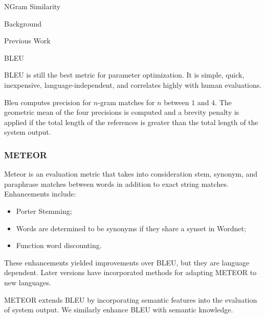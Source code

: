 \begin{block}{NGram Similarity}

Background

Previous Work


BLEU


BLEU is still the best metric for parameter optimization\cite{Cer:2010:BLM:1857999.1858079}. 
It is simple, quick, inexpensive, language-independent, and correlates highly with human evaluations. 


Bleu computes precision for $n$-gram matches for $n$ between $1$ and $4$. 
The geometric mean of the four precisions is computed and a brevity penalty is applied if the total length of the references is greater than the total length of the system output. 

\subsubsection{METEOR}
\label{sec:meteor}


Meteor is an evaluation metric that takes into consideration stem, synonym, and paraphrase matches between words in addition to exact string matches.
Enhancements include:
\begin{itemize}
\item 
Porter Stemming;
\item 
Words  are determined to  be synonyms if they share a synset in Wordnet;
\item 
Function word discounting.
\end{itemize}

These enhancements yielded improvements over BLEU, but they are language dependent. 
Later versions have incorporated methods for adapting METEOR to new languages. 


METEOR extends BLEU by incorporating semantic features into the evaluation of system output. 
We similarly enhance BLEU with semantic knowledge. 


\end{block}
